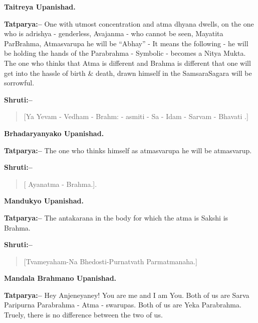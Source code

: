 \begin{flushright}
\textbf{Taitreya Upanishad.}
\end{flushright}

\textbf{Tatparya:–} One with utmost concentration and atma dhyana dwells, on the one who is adrishya - genderless, Avajanma - who cannot be seen, Mayatita ParBrahma, Atmasvarupa he will be “Abhay” - It means the following - he will be holding the hands of the Parabrahma - Symbolic - becomes a Nitya Mukta. The one who thinks that Atma is different and Brahma is different that one will get into the hassle of birth \& death, drawn himself in the SamsaraSagara will be sorrowful.

\newpage

\textbf{Shruti:–}

\begin{verse}
[Ya Yevam - Vedham - Brahm: - asmiti - Sa - Idam - Sarvam - Bhavati .]
\end{verse}

\begin{flushright}
\textbf{Brhadaryanyako Upanishad.}
\end{flushright}

\textbf{Tatparya:–} The one who thinks himself as atmasvarupa he will be atmasvarup.

\textbf{Shruti:–}

\begin{verse}
[ Ayanatma - Brahma.].
\end{verse}

\begin{flushright}
\textbf{Mandukyo Upanishad.}
\end{flushright}

\textbf{Tatparya:–} The antakarana in the body for which the atma is Sakshi is Brahma.

\textbf{Shruti:–}

\begin{verse}
[Tvameyaham-Na Bhedosti-Purnatvath Parmatmanaha.]
\end{verse}

\begin{flushright}
\textbf{Mandala Brahmano Upanishad.}
\end{flushright}

\textbf{Tatparya:–} Hey Anjeneyaney! You are me and I am You. Both of us are Sarva Paripurna Parabrahma - Atma - swarupas. Both of us are Yeka Parabrahma. Truely, there is no difference between the two of us.

